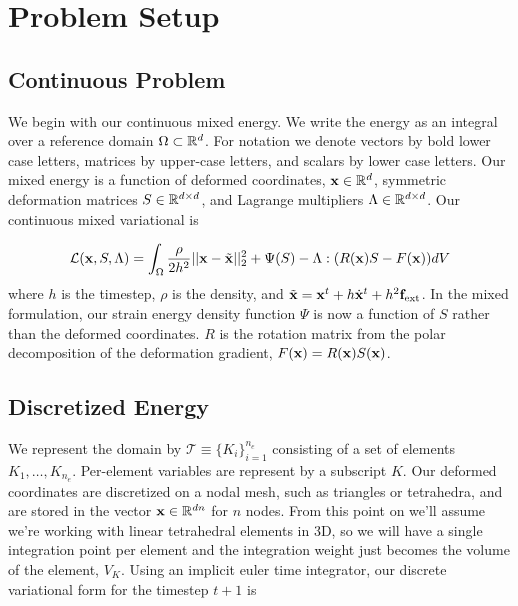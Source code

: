 \section{Problem Setup}

\subsection{Continuous Problem}
We begin with our continuous mixed energy. We write the energy as an integral over a reference domain $\Omega \subset \mathbb{R}^d$. For notation we denote vectors by bold lower case letters, matrices by upper-case letters, and scalars by lower case letters. Our mixed energy is a function of deformed coordinates, $\mathbf{x} \in \mathbb{R}^d$, symmetric deformation matrices $S \in \mathbb{R}^{d \times d}$, and Lagrange multipliers $\Lambda \in \mathbb{R}^{d \times d}$. Our continuous mixed variational is 

\begin{equation}
\mathcal{L}(\mathbf{x},S,\Lambda) = \int_\Omega \frac{\rho}{2h^2} ||\mathbf{x} - \tilde{\mathbf{x}}||_2^2 
+ \Psi(S) - \Lambda : (R(\mathbf{x})S - F(\mathbf{x})) dV
\end{equation}
where $h$ is the timestep, $\rho$ is the density, and $\tilde{\mathbf{x}} = \mathbf{x}^t + h\dot{\mathbf{x}}^t + h^2 \mathbf{f}_\text{ext}$. In the mixed formulation, our strain energy density function $\Psi$ is now a function of $S$ rather than the deformed coordinates. $R$ is the rotation matrix from the polar decomposition of the deformation gradient, $F(\mathbf{x}) = R(\mathbf{x})S(\mathbf{x})$.

\subsection{Discretized Energy}

We represent the domain by $\mathcal{T} \equiv \{K_i\}_{i=1}^{n_e}$ consisting of a set of elements $K_1,\dots,K_{n_e}$.
Per-element variables are represent by a subscript $K$. Our deformed coordinates are discretized on a nodal mesh, such as triangles or tetrahedra, and are stored in the vector $\mathbf{x} \in \mathbb{R}^{dn}$ for $n$ nodes.
From this point on we'll assume we're working with linear tetrahedral elements in 3D, so we will have a single integration point per element and the integration weight just becomes the volume of the element, $V_K$. Using an implicit euler time integrator, our discrete variational form for the timestep $t+1$ is

